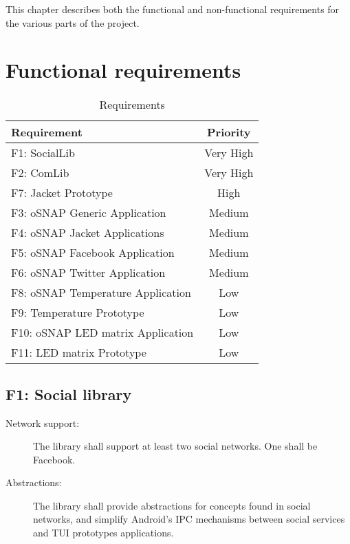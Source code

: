 
This chapter describes both the functional and non-functional requirements
for the various parts of the project.

\section{Functional requirements}

\begin{table}
		\caption{Requirements}
\begin{tabular}{ | l | c | }
	\hline                        
	\bf{Requirement} & \bf{Priority} \\
	\hline
	F1:  SocialLib						& Very High \\
	F2:  ComLib							& Very High \\
	F7:  Jacket Prototype				& High \\
	F3:  oSNAP Generic Application		& Medium \\
	F4:  oSNAP Jacket Applications		& Medium \\
	F5:  oSNAP Facebook Application		& Medium \\
	F6:  oSNAP Twitter Application		& Medium \\
	F8:  oSNAP Temperature Application	& Low \\
	F9:  Temperature Prototype			& Low \\
	F10: oSNAP LED matrix Application	& Low \\
	F11: LED matrix Prototype			& Low \\
	\hline  
\end{tabular}
\end{table}

\subsection{F1: Social library}
\begin{description}
	\item[Network support:] The library shall support at least two social
	networks. One shall be Facebook.
	\item[Abstractions:] The library shall provide abstractions for concepts
	found in social networks, and simplify Android's IPC mechanisms
	between social services and TUI prototypes applications.
\end{description}
	
